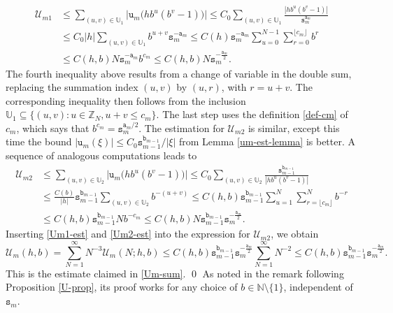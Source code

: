 \documentclass[12pt, twoside]{article}
\theoremstyle{definition}
\numberwithin{equation}{section}
\begin{document}
\begin{align}
\mathscr{U}_{m1} &\leq \sum_{(u,v) \in \mathbb U_1} \bigl| \mathtt u_m \bigl(h b^u (b^v -1) \bigr)\bigr| \leq C_0 \sum_{(u,v) \in \mathbb U_1}\frac{|h b^u(b^v-1)|}{\mathtt s_m^{\mathtt a_m}} \nonumber \\ 
&\leq C_0 |h| \sum_{(u, v) \in \mathbb U_1} { b^{u+v}}{\mathtt s_m^{-\mathtt a_m}} \leq C(h) \mathtt s_m^{-\mathtt a_m} \sum_{u=0}^{N-1} \sum_{r=0}^{\lfloor c_m \rfloor} b^{r} \nonumber \\
&\leq C(h, b) N \mathtt s_m^{-\mathtt a_m} b^{c_m} \leq C(h, b) N \mathtt s_m^{-\frac{\mathtt a_m}{2}}. \label{Um1-est}
\end{align}
The fourth inequality above results from a change of variable in the double sum, replacing the summation index $(u,v)$ by $(u, r)$, with $r = u+v$. The corresponding inequality then follows from the inclusion $\mathbb U_1 \subseteq \{(u, v): u \in \mathbb Z_N, u+v \leq c_m\}$. The last step uses the definition \eqref{def-cm} of $c_m$, which says that $b^{c_m} = \mathtt s_m^{\mathtt a_m/2}$. 
\vskip0.1in
\noindent The estimation for $\mathscr{U}_{m2}$ is similar, except this time the bound $|\mathtt u_m(\xi)| \leq C_0 \mathtt s_{m-1}^{\mathtt b_{m-1}}/|\xi|$ from Lemma \ref{um-est-lemma} is better. A sequence of analogous computations leads to 
\begin{align}
\mathscr{U}_{m2} &\leq \sum_{(u,v) \in \mathbb U_2} \bigl| \mathtt u_m \bigl(h b^u (b^v -1) \bigr)\bigr| \leq C_0 \sum_{(u,v) \in \mathbb U_2} \frac{\mathtt s_{m-1}^{\mathtt b_{m-1}}}{|h b^u (b^v-1)|} \nonumber \\
&\leq \frac{C(b)}{|h|} \mathtt s_{m-1}^{\mathtt b_{m-1}} \sum_{(u,v) \in \mathbb U_2}  b^{-(u+v)} \leq C(h, b) \mathtt s_{m-1}^{\mathtt b_{m-1}} \sum_{u=1}^{N} \sum_{r= \lfloor c_m \rfloor}^N b^{-r} \nonumber \\ &\leq C(h,b) \mathtt s_{m-1}^{\mathtt b_{m-1}} N b^{-c_m}  
\leq  C(h, b) N \mathtt s_{m-1}^{\mathtt b_{m-1}} \mathtt s_{m}^{-\frac{\mathtt a_m}{2}}. \label{Um2-est}
\end{align} 
Inserting \eqref{Um1-est} and \eqref{Um2-est} into the expression for $\mathcal U_{m2}$, we obtain 
\[ \mathcal U_m(h, b) = \sum_{N=1}^{\infty} N^{-3} \mathscr{U}_{m}(N; h, b) \leq C(h, b) \mathtt s_{m-1}^{\mathtt b_{m-1}} \mathtt s_{m}^{-\frac{\mathtt a_m}{2}} \sum_{N=1}^{\infty} N^{-2} 
\leq C(h, b)   \mathtt s_{m-1}^{\mathtt b_{m-1}} \mathtt s_{m}^{-\frac{\mathtt a_m}{2}}. \] 
This is the estimate claimed in \eqref{Um-sum}.
\qed
\vskip0.1in
\noindent As noted in the remark following Proposition \ref{U-prop}, its proof works for any choice of $b \in \mathbb N \setminus \{1\}$, independent of $\mathtt s_m$. 
\end{document}
